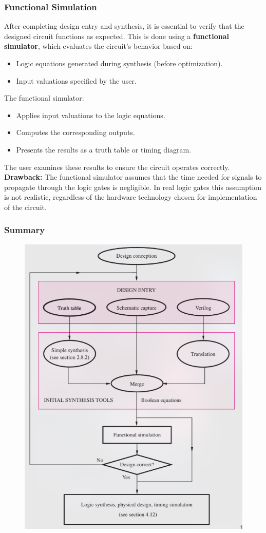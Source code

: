 \documentclass[a4paper,12pt]{article}
\begin{document}
      \subsubsection{Functional Simulation}
      After completing design entry and synthesis, it is essential to verify that the designed circuit functions as expected. This is done using a \textbf{functional simulator}, which evaluates the circuit's behavior based on:
      \begin{itemize}
        \item Logic equations generated during synthesis (before optimization).
        \item Input valuations specified by the user.
      \end{itemize}
      The functional simulator:
      \begin{itemize}
        \item Applies input valuations to the logic equations.
        \item Computes the corresponding outputs.
        \item Presents the results as a truth table or timing diagram.
      \end{itemize}
      The user examines these results to ensure the circuit operates correctly.
      \textbf{Drawback: }The functional simulator assumes that the time needed for signals to propagate through the logic gates is negligible. In real logic gates this assumption is not realistic, regardless of the hardware technology chosen for implementation of the circuit.
      \subsubsection{Summary}
\begin{figure}[h!]
            \centering
            \includegraphics[scale=0.6]{figs/flowchart.png}
            \label{stemplot}
          \end{figure}  
          
\end{document}
